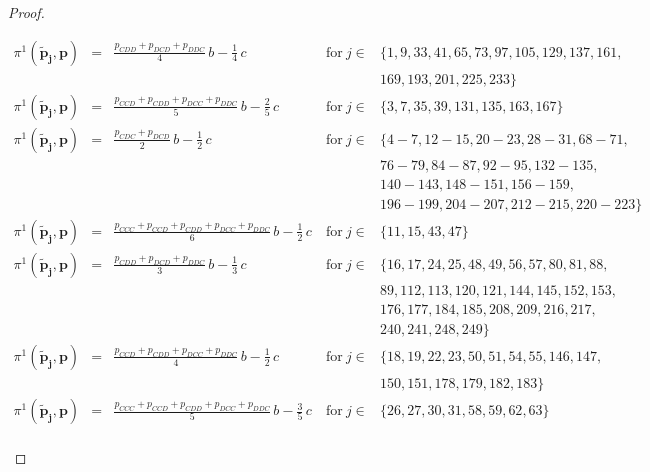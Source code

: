 \documentclass[9pt,twoside,lineno]{pnas-new}
\theoremstyle{plainCl1}
\theoremstyle{plainCl2}
\begin{document}
\begin{proof}
\begin{enumerate}
\begin{equation*}
\begin{array}{lclll}
  \pi^1(\mathbf{\tilde p_j},\mathbf{p}) &= 
  &\displaystyle \frac{p_{CDD} + p_{DCD} + p_{DDC}}{4} \,b - \frac{1}{4} \,c
  &~\text{for}~ j\! \in\!  
  & \{ 1, 9, 33, 41, 65, 73, 97, 105, 129, 137, 161,
    \\ & & &  &169, 193, 201, 225, 233\} \\[0.2cm]
      
  \pi^1(\mathbf{\tilde p_j},\mathbf{p}) &= 
  &\displaystyle \frac{p_{CCD} + p_{CDD} + p_{DCC} + p_{DDC}}{5}\, b - \frac{2}{5} \,c
  &~\text{for}~ j\! \in\!  
  & \{ 3, 7, 35, 39, 131, 135, 163, 167\} \\[0.2cm]
  
  \pi^1(\mathbf{\tilde p_j},\mathbf{p}) &= 
  &\displaystyle \frac{p_{CDC} + p_{DCD}}{2} \, b - \frac{1}{2} \, c
  &~\text{for}~ j\! \in\!  
  & \{ 4 \!- \!7, 12 \!- \!15, 20 \!- \!23, 28 \!- \!31, 68 \!- \!71,
      \\ & & &  &76 \!- \!79, 84 \!- \!87, 92 \!- \!95, 132 \!- \!135, 
      \\ & & & &140 \!- \!143, 148- 151, 156 \!- \!159, 
      \\ & & & &196 \!- \!199, 204 \!- \!207, 212 \!- \!215, 220 \!- \!223\} \\[0.2cm]
      
  \pi^1(\mathbf{\tilde p_j},\mathbf{p}) &= 
  &\displaystyle \frac{p_{CCC} + p_{CCD} + p_{CDD} + p_{DCC} + p_{DDC}}{6} \,b - \frac{1}{2} \, c
  &~\text{for}~ j\! \in\! 
  & \{ 11, 15, 43, 47\} \\ [0.2cm]
  
  \pi^1(\mathbf{\tilde p_j},\mathbf{p}) &= 
  &\displaystyle \frac{p_{CDD} + p_{DCD} + p_{DDC}}{3} \, b - \frac{1}{3} \, c
  &~\text{for}~ j\! \in\! 
  & \{16,17,24,25,48,49,56,57,80,81,88,
      \\ & & & &89,112, 113,120,121, 144,145,152,153,
      \\ & & & &176,177,184,185,208,209,216,217,
      \\ & & & &240, 241,248,249\} \\[0.2cm]
      
  \pi^1(\mathbf{\tilde p_j},\mathbf{p}) &= 
  &\displaystyle \frac{p_{CCD} + p_{CDD} + p_{DCC} + p_{DDC}}{4} \, b - \frac{1}{2} \, c
  &~\text{for}~ j\! \in\! 
  & \{ 18, 19, 22, 23, 50, 51, 54, 55, 146, 147,
      \\ & & &  &150, 151, 178, 179, 182, 183\} \\[0.2cm]
      
  \pi^1(\mathbf{\tilde p_j},\mathbf{p}) &= 
  &\displaystyle \frac{p_{CCC} + p_{CCD} + p_{CDD} + p_{DCC} + p_{DDC}}{5} \, b - \frac{3}{5} \, c
  &~\text{for}~ j\! \in\! 
  & \{ 26, 27, 30, 31, 58, 59, 62, 63\} \\ [0.2cm]
  

\end{array}
\end{equation*}
\end{enumerate}
\end{proof}
\end{document}
